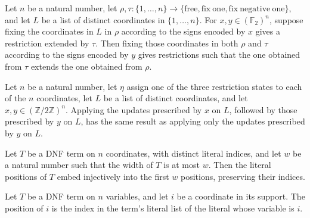 \begin{theorem}
\label{FABL.CoordRestriction.Extends.parallel_fixCoordinateList}
\leanok
{}
Let $n$ be a natural number, let
$\rho,\tau:\{1,\ldots,n\}\to\{\mathrm{free},\mathrm{fix\ one},\mathrm{fix\ negative\
one}\}$, and let $L$ be a list of distinct coordinates in $\{1,\ldots,n\}$. For
$x,y\in(\mathbb F_2)^n$, suppose fixing the coordinates in $L$ in $\rho$ according to
the signs encoded by $x$ gives a restriction extended by $\tau$. Then fixing those
coordinates in both $\rho$ and $\tau$ according to the signs encoded by $y$ gives
restrictions such that the one obtained from $\tau$ extends the one obtained from
$\rho$.
\end{theorem}

\begin{theorem}
\label{FABL.CoordRestriction.fixCoordinateList_overwrite}
\leanok
{}
\difficulty{4}
Let $n$ be a natural number, let $\eta$ assign one of the three restriction states to
each of the $n$ coordinates, let $L$ be a list of distinct coordinates, and let
$x,y\in(\mathbb{Z}/2\mathbb{Z})^n$. Applying the updates prescribed by $x$ on $L$,
followed by those prescribed by $y$ on $L$, has the same result as applying only the
updates prescribed by $y$ on $L$.
\end{theorem}

\begin{definition}
\label{FABL.DNFTerm.positionEmbedding}
\leanok
{}
Let $T$ be a DNF term on $n$ coordinates, with distinct literal indices, and let $w$ be
a natural number such that the width of $T$ is at most $w$. Then the literal positions
of $T$ embed injectively into the first $w$ positions, preserving their indices.
\end{definition}

\begin{definition}
\label{FABL.DNFTerm.positionOfSupport}
\leanok
{}
Let $T$ be a DNF term on $n$ variables, and let $i$ be a coordinate in its support. The
position of $i$ is the index in the term’s literal list of the literal whose variable is
$i$.
\end{definition}

